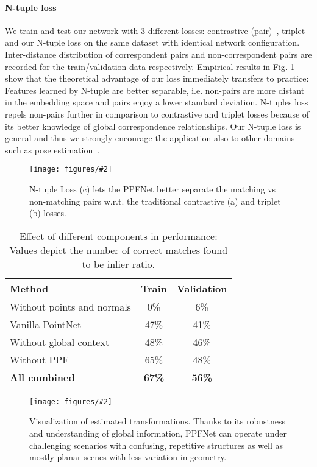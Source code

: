 \documentclass[10pt,twocolumn,letterpaper]{article}
\theoremstyle{break}
\newcommand{\insertimageC}[5]{ \begin{figure}[#5]
\centering
\texttt{[image: figures/\#2]}
\caption{#3}
\label{#4}
\vspace{-2mm}
\end{figure}
}
\newcommand{\insertimageStar}[5]{ \begin{figure*}[#5]
\centering
\texttt{[image: figures/\#2]}
\caption{#3}
\label{#4}
\vspace{-2mm}
\end{figure*}
}
\begin{document}
\paragraph{N-tuple loss} 
We train and test our network with 3 different losses: contrastive (pair)~\cite{hadsell2006dimensionality}, triplet~\cite{hoffer2015deep} and our N-tuple loss on the same dataset with identical network configuration. Inter-distance distribution of correspondent pairs and non-correspondent pairs are recorded for the train/validation data respectively. Empirical results in Fig. \ref{fig:loss_compare} show that the theoretical advantage of our loss immediately transfers to practice: Features learned by N-tuple are better separable, i.e. non-pairs are more distant in the embedding space and pairs enjoy a lower standard deviation. N-tuples loss repels non-pairs further in comparison to contrastive and triplet losses because of its better knowledge of global correspondence relationships.  Our N-tuple loss is general and thus we strongly encourage the application also to other domains such as pose estimation~\cite{wohlhart2015learning}.
\insertimageC{1}{loss_comparison_new_cropped.pdf}{N-tuple Loss (c) lets the PPFNet better separate the matching vs non-matching pairs w.r.t. the traditional contrastive (a) and triplet (b) losses.}{fig:loss_compare}{t!}
\begin{table}[t!]
  \centering
  \caption{Effect of different components in performance: Values depict the number of correct matches found to be  inlier ratio.}
  \setlength\tabcolsep{13.5 pt}
  \small
    \begin{tabular}{lcc}
    \toprule
    Method & Train & Validation \\
    \midrule
    Without points and normals & 0\%     & 6\% \\
    Vanilla PointNet~\cite{qi2016pointnet} & 47\%    & 41\% \\
    Without global context & 48\%    & 46\% \\
    Without PPF & 65\%    & 48\% \\
    \textbf{All combined}   & \textbf{67\%}    & \textbf{56\%} \\
    \bottomrule
    \end{tabular}\vspace{-3mm}
  \label{tab:ppf_boost}\end{table}\insertimageStar{1}{match_result_visual_cropped.pdf}{Visualization of estimated transformations. Thanks to its robustness and understanding of global information, PPFNet can operate under challenging scenarios with confusing, repetitive structures as well as mostly planar scenes with less variation in geometry.}{fig:matchingvisuals}{t!}
\vspace{-3mm}
\end{document}
